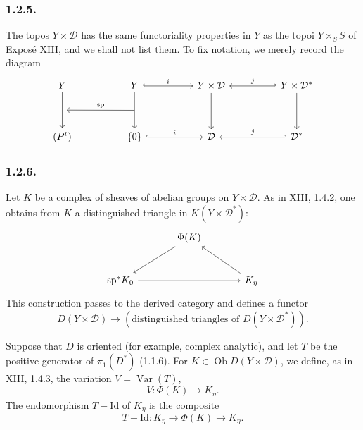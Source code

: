 \subsubsection*{1.2.5.}
The topos $Y\times\mathcal D$ has the same functoriality properties
in $Y$ as the topoi $Y\times_S S$ of Expos\'e XIII, and we shall not
list them.  To fix notation, we merely record the diagram
\[
\begin{tikzcd}[row sep=huge, column sep=huge]
Y \arrow[d, ""{name=A}]
  & Y \arrow[d, ""{name=B}] \arrow[r, hook, "i"]
  & Y\times\mathcal D \arrow[d]
  & Y\times\mathcal D^* \arrow[d] \arrow[l, hook', "j"'] \\
(P^t)
  & \{0\} \arrow[r, hook, "i"]
  & \mathcal D
  & \mathcal D^* \arrow[l, hook', "j"']
    \arrow[from=B, to=A, "\mathrm{sp}"']
\end{tikzcd}
\]

\subsubsection*{1.2.6.}
Let $K$ be a complex of sheaves of abelian groups on
$Y\times\mathcal D$.  As in XIII, 1.4.2, one obtains from $K$ a
distinguished triangle in $K(Y\times\mathcal D^*)$:
\[
\begin{tikzcd}[row sep=large, column sep=large]
{} & \Phi(K) \arrow[dl] & {} \\
\mathrm{sp}^*K_0 \arrow[rr] & {} & K_\eta \arrow[ul]
\end{tikzcd}
\]
This construction passes to the derived category and defines a
functor
\[
D(Y\times\mathcal D)
\longrightarrow
(\text{distinguished triangles of }D(Y\times\mathcal D^*)).
\]

Suppose that $D$ is oriented (for example, complex analytic), and
let $T$ be the positive generator of $\pi_1(D^*)$ (1.1.6).  For
$K\in\operatorname{Ob}D(Y\times\mathcal D)$, we define, as in XIII,
1.4.3, the \underline{variation} $V=\operatorname{Var}(T)$,
\[
V:\Phi(K)\longrightarrow K_\eta.
\]
The endomorphism $T-\mathrm{Id}$ of $K_\eta$ is the composite
\[
T-\mathrm{Id}:K_\eta\longrightarrow\Phi(K)
\longrightarrow K_\eta.
\]

